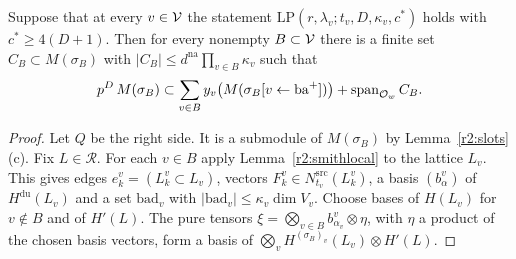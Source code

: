 \begin{proposition}\label{r2:lemmaJ}
Suppose that at every $v\in\mathcal V$ the statement $\mathrm{LP}(r,\lambda_v;t_v,D,\kappa_v,c^*)$ holds with $c^*\ge4(D+1)$. Then for every nonempty $B\subset\mathcal V$ there is a finite set $C_B\subset M(\sigma_B)$ with $\lvert C_B\rvert\le d^{\mathrm{na}}\prod_{v\in B}\kappa_v$ such that
\[
p^D\,M(\sigma_B)\subset\sum_{v\in B}y_v\big(M(\sigma_B[v\leftarrow\mathrm{ba}^+])\big)+\operatorname{span}_{\mathcal O_w}C_B .
\]
\end{proposition}

\begin{proof}
Let $Q$ be the right side. It is a submodule of $M(\sigma_B)$ by Lemma~\ref{r2:slots}(c). Fix $L\in\mathcal R$. For each $v\in B$ apply Lemma~\ref{r2:smithlocal} to the lattice $L_v$. This gives edges $e^v_k=(L^v_k\subset L_v)$, vectors $F^v_k\in N^{\mathrm{src}}_{t_v}(L^v_k)$, a basis $(b^v_\alpha)$ of $H^{\mathrm{du}}(L_v)$ and a set $\mathrm{bad}_v$ with $\lvert\mathrm{bad}_v\rvert\le\kappa_v\dim V_v$. Choose bases of $H(L_v)$ for $v\notin B$ and of $H'(L)$. The pure tensors $\xi=\bigotimes_{v\in B}b^v_{\alpha_v}\otimes\eta$, with $\eta$ a product of the chosen basis vectors, form a basis of $\bigotimes_vH^{(\sigma_B)_v}(L_v)\otimes H'(L)$.


\end{proof}
